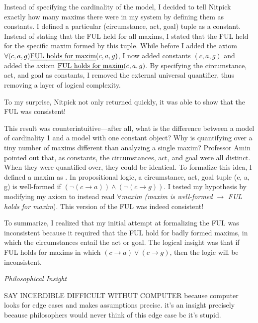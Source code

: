 \begin{isabellebody}
\begin{isamarkuptext}
Instead of specifying the cardinality of the model, I decided to tell Nitpick exactly how many 
maxims there were in my system by defining them as constants. I defined a particular 
(circumstance, act, goal) tuple as a constant. Instead of
stating that the FUL held for all maxims, I stated that the FUL held for the specific maxim formed by this tuple.
While before I added the axiom $\forall (c, a, g) \text{\emph{FUL holds for maxim}} (c, a, g)$, I now added constants $(c, a, g)$ 
and added the axiom $\text{\emph{FUL holds for maxim}} (c, a, g)$. By specifying the circumstance, act, and goal 
as constants, I removed the external universal quantifier, thus removing a layer of logical complexity.

To my surprise, Nitpick not only returned quickly, it was able to show that the FUL was consistent!

This result was counterintuitive—after all, what is the difference between a model of cardinality 
1 and a model with one constant object? Why is quantifying over a tiny number of maxims different
 than analyzing a single maxim? Professor Amin pointed out that, as constants, the 
circumstances, act, and goal were all distinct. When they were quantified over, 
they could be identical. To formalize this idea, I defined a maxim as . In propositional 
logic, a circumstance, act, goal tuple (c, a, g) is well-formed if $(\neg (c \longrightarrow a) ) \wedge 
(\neg(c \longrightarrow g))$. I tested my hypothesis by modifying my axiom to instead read $\forall$\emph{maxim
(maxim is well-formed} $\longrightarrow$ \emph{FUL holds for maxim}). This version of the FUL was indeed consistent!

To summarize, I realized that my initial attempt at formalizing the FUL was inconsistent because 
it required that the FUL hold for badly formed maxims, in which the circumstances entail the act or 
goal. The logical insight was that if FUL holds for maxims in which $(c \longrightarrow a) \vee 
(c \longrightarrow g)$, then the logic will be inconsistent.

\emph{Philosophical Insight}

SAY INCERDIBLE DIFFICULT WITHUT COMPUTER because computer looks for edge cases and makes assumptions precise.
it's an insight precisely because philosophers would never think of this edge case bc it's stupid.


\end{isamarkuptext}
\end{isabellebody}
